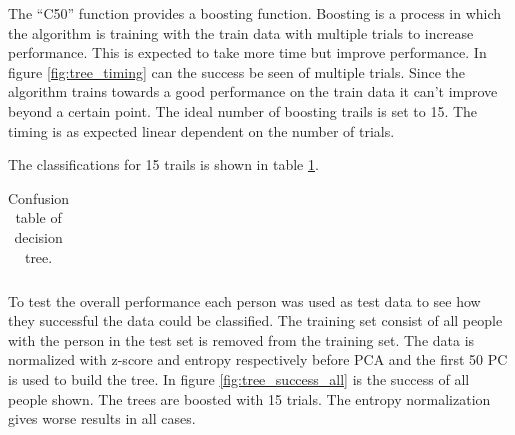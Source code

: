 The ``C50'' function provides a boosting function.
Boosting is a process in which the algorithm is training with the train data with multiple trials to increase performance.
This is expected to take more time but improve performance.
In figure \ref{fig:tree_timing} can the success be seen of multiple trials.
Since the algorithm trains towards a good performance on the train data it can't improve beyond a certain point.
The ideal number of boosting trails is set to 15.
The timing is as expected linear dependent on the number of trials.

The classifications for 15 trails is shown in table \ref{tb:tree_confus}. 

\begin{table}[H]
    \centering
    \begin{subtable}{0.005\textwidth}
    \end{subtable}
    \begin{subtable}{0.8\textwidth}
        \centering
    \end{subtable}

    \begin{subtable}{0.0005\textwidth}
        \flushright
    \end{subtable}
    \begin{subtable}{0.8\textwidth}
        \begin{subtable}{\textwidth}
            \centering
            \begin{tabular}{*{11}{c}}
                
            \end{tabular}
        \end{subtable}
    \end{subtable}
    \caption{Confusion table of decision tree.}
    \label{tb:tree_confus}
\end{table}

To test the overall performance each person was used as test data to see how they successful the data could be classified.
The training set consist of all people with the person in the test set is removed from the training set. 
The data is normalized with z-score and entropy respectively before PCA and the first 50 PC is used to build the tree. 
In figure \ref{fig:tree_success_all} is the success of all people shown.
The trees are boosted with 15 trials.
The entropy normalization gives worse results in all cases.

